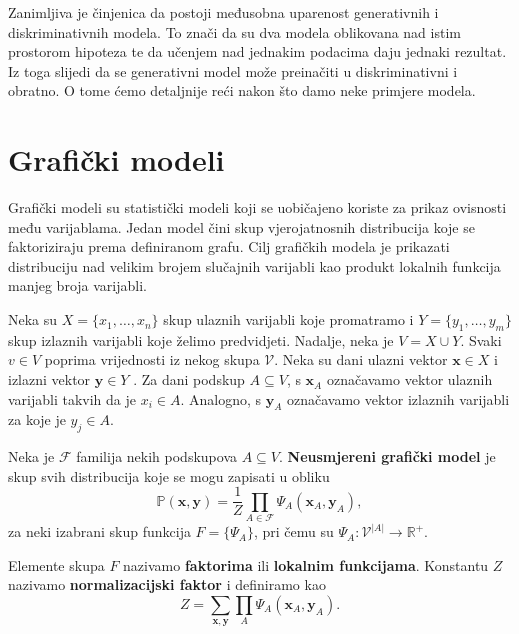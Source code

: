 \documentclass[a4paper,twoside,12pt]{memoir} %
\newcommand{\tb}{\textbf}
\begin{document}
	Zanimljiva je činjenica da postoji međusobna uparenost generativnih i diskriminativnih modela. To znači da su dva modela oblikovana nad istim prostorom hipoteza te da učenjem nad jednakim podacima daju jednaki rezultat. Iz toga slijedi da se generativni model može preinačiti u diskriminativni i obratno. O tome ćemo detaljnije reći nakon što damo neke primjere modela.


	\section{Grafički modeli}

	Grafički modeli su statistički modeli koji se uobičajeno koriste za prikaz ovisnosti među varijablama. Jedan model čini skup vjerojatnosnih distribucija koje se faktoriziraju prema definiranom grafu. Cilj grafičkih modela je prikazati distribuciju nad velikim brojem slučajnih varijabli kao produkt lokalnih funkcija manjeg broja varijabli.

	\bigskip

	Neka su $X = \{x_1, \ldots, x_n\}$ skup ulaznih varijabli koje promatramo i $Y = \{y_1, \ldots, y_m\}$ skup izlaznih varijabli koje želimo predvidjeti. Nadalje, neka je $V = X \cup Y$. Svaki $v \in V$ poprima vrijednosti iz nekog skupa $\mathcal{V}$. Neka su dani ulazni vektor $\mathbf{x} \in X$  i izlazni vektor $\mathbf{y} \in Y$ . Za dani podskup $A \subseteq V$, s $\mathbf{x}_A$ označavamo vektor ulaznih varijabli takvih da je $x_i \in A$. Analogno, s $\mathbf{y}_A$ označavamo vektor izlaznih varijabli za koje je $y_j \in A$.

	\begin{defn}
		Neka je $\mathcal{F}$ familija nekih podskupova $A \subseteq V$. \tb{Neusmjereni grafički model} je skup svih distribucija koje se mogu zapisati u obliku
		\begin{equation}\label{graph_distr}
		\mathbb{P}(\mathbf{x}, \mathbf{y}) = \frac{1}{Z} \prod_{A \in \mathcal{F}} \Psi_{A} (\mathbf{x}_A, \mathbf{y}_A),
		\end{equation}
		za neki izabrani skup funkcija $F = \{\Psi_A\}$, pri čemu su $\Psi_A : \mathcal{V}^{|A|} \to \mathbb{R}^+$.

		\medskip

		Elemente skupa $F$ nazivamo \tb{faktorima} ili \tb{lokalnim funkcijama}. Konstantu $Z$ nazivamo \tb{normalizacijski faktor} i definiramo kao
		\begin{equation*}
		Z = \sum_{\mathbf{x}, \mathbf{y}} \prod_{A} \Psi_{A} (\mathbf{x}_A, \mathbf{y}_A).
		\end{equation*}
	\end{defn}
\end{document}
